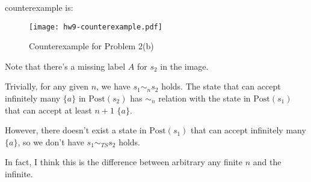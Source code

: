 counterexample is:

\begin{figure}[H]
    \centering
    \texttt{[image: hw9-counterexample.pdf]}
    \caption{Counterexample for Problem 2(b)}
\end{figure}

Note that there's a missing label $A$ for $s_2$ in the image.

Trivially, for any given $n$, we have $s_1 \sim_{n} s_2$ holds. The state that can accept infinitely many $\{a\}$
in $\text{Post}(s_2)$ has $\sim_{n}$ relation with the state in $\text{Post}(s_1)$ that can accept at least $n + 1$ $\{a\}$.

However, there doesn't exist a state in $\text{Post}(s_1)$ that can accept infinitely many $\{a\}$,
so we don't have $s_1 \sim_{TS} s_2$ holds.

In fact, I think this is the difference between arbitrary any finite $n$ and the infinite.
